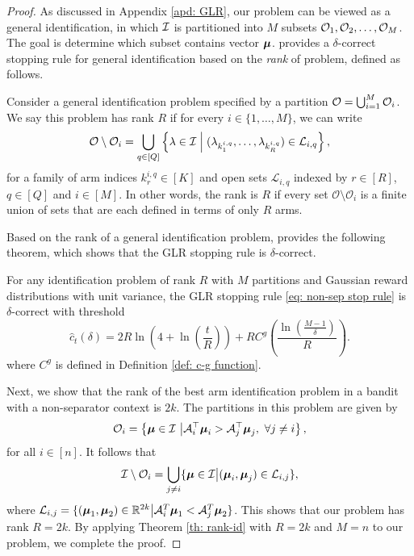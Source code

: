 \begin{proof}
         As discussed in Appendix \ref{apd: GLR}, our problem can be viewed as a general identification, in which $\mathcal{I}$ is partitioned into $M$ subsets $\mathcal{O}_1, \mathcal{O}_2, \ldots, \mathcal{O}_M$. The goal is determine which subset contains vector $\boldsymbol{\mu}$. \cite{kaufmann2021mixture} provides a $\delta$-correct stopping rule for general identification based on the \textit{rank} of problem, defined as follows.         
        \begin{definition}[Rank]
            Consider a general identification problem specified by a partition $\mathcal{O} = \bigcup_{i=1}^M \mathcal{O}_i$. We say this problem has rank $R$ if for every $i \in \{1, \ldots, M\}$, we can write
            \[
            \mathcal{O} \setminus \mathcal{O}_i = \bigcup_{q \in [Q]} \left\{ \lambda \in \mathcal{I} \; \middle| \; (\lambda_{k^{i,q}_1}, \ldots, \lambda_{k^{i,q}_R}) \in \mathcal{L}_{i,q} \right\},
            \]
            for a family of arm indices $k^{i,q}_r \in [K]$ and open sets $\mathcal{L}_{i,q}$ indexed by $r \in [R]$, $q \in [Q]$ and $i \in [M]$. In other words, the rank is $R$ if every set $\mathcal{O} \setminus \mathcal{O}_i$ is a finite union of sets that are each defined in terms of only $R$ arms. 
        \end{definition} 
        Based on the rank of a general identification problem, \cite{kaufmann2021mixture} provides the following theorem, which shows that the GLR stopping rule is $\delta$-correct.        
        \begin{theorem} \label{th: rank-id}
            For any identification problem of rank $R$ with $M$ partitions and Gaussian reward distributions with unit variance, the GLR stopping rule \ref{eq: non-sep stop rule} is $\delta$-correct with threshold
            \[\hat{c}_t(\delta) = 2R \ln\left(4 + \ln\left(\frac{t}{R}\right)\right) + R C^{g} \left(\frac{\ln \left( \frac{M-1}{\delta} \right) }{R} \right)
            .\]
            where \(C^{g}\) is defined in Definition \ref{def: c-g function}.
        \end{theorem}  
    
        Next, we show that the rank of the best arm identification problem in a bandit with a non-separator context is $2k$. The partitions in this problem are given by
        \begin{align*}
           \mathcal{O}_i = \left\{ \boldsymbol{\mu} \in \mathcal{I} \ \big| \mathcal{A}_i^\top \boldsymbol{\mu}_i > \mathcal{A}_j^\top \boldsymbol{\mu}_j, \ \forall j \neq i \right\},
        \end{align*}
        for all $i \in [n]$. It follows that
        \begin{align*}
            \mathcal{I} \setminus \mathcal{O}_i = \bigcup_{j \neq i} \{ \boldsymbol{\mu} \in \mathcal{I} \big| (\boldsymbol{\mu}_{i}, \boldsymbol{\mu}_j) \in \mathcal{L}_{i,j} \},
        \end{align*} 
        where $\mathcal{L}_{i,j} = \{ (\boldsymbol{\mu}_1, \boldsymbol{\mu}_2) \in \mathbb{R}^{2k} \big| \mathcal{A}_i^T \boldsymbol{\mu}_1 < \mathcal{A}_j^T \boldsymbol{\mu}_2 \}$. This shows that our problem has rank $R = 2k$. By applying Theorem \ref{th: rank-id} with $R = 2k$ and $M = n$ to our problem, we complete the proof.
    \end{proof}

